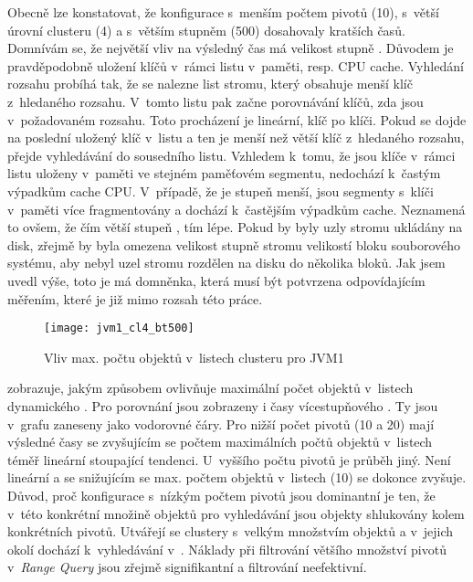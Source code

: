 Obecně lze konstatovat, že konfigurace s~menším počtem pivotů (\num{10}), s~větší úrovní clusteru (\num{4}) a s~větším stupněm \BPTree{} (\num{500}) dosahovaly kratších časů.
Domnívám se, že největší vliv na výsledný čas má velikost stupně \BPTree{}.
Důvodem je pravděpodobně uložení klíčů v~rámci listu v~paměti, resp. CPU cache.
Vyhledání rozsahu probíhá tak, že se nalezne list stromu, který obsahuje menší klíč z~hledaného rozsahu.
V~tomto listu pak začne porovnávání klíčů, zda jsou v~požadovaném rozsahu.
Toto procházení je lineární, klíč po klíči.
Pokud se dojde na poslední uložený klíč v~listu a ten je menší než větší klíč z~hledaného rozsahu, přejde vyhledávání do sousedního listu.
Vzhledem k~tomu, že jsou klíče v~rámci listu uloženy v~paměti ve stejném paměťovém segmentu, nedochází k~častým výpadkům cache CPU.
V~případě, že je stupeň \BPTree{} menší, jsou segmenty s~klíči v~paměti více fragmentovány a dochází k~častějším výpadkům cache.
Neznamená to ovšem, že čím větší stupeň \BPTree{}, tím lépe. 
Pokud by byly uzly stromu ukládány na disk, zřejmě by byla omezena velikost stupně stromu velikostí bloku souborového systému, aby nebyl uzel stromu rozdělen na disku do několika bloků.
Jak jsem uvedl výše, toto je má domněnka, která musí být potvrzena odpovídajícím měřením, které je již mimo rozsah této práce.

\begin{figure}[t]
\centering
\texttt{[image: jvm1\_cl4\_bt500]}
\caption{Vliv max. počtu objektů v~listech clusteru pro JVM1}
\label{fig:jvm1cl4_bt500}
\end{figure}

 zobrazuje, jakým způsobem ovlivňuje maximální počet objektů v~listech dynamického .
Pro porovnání jsou zobrazeny i časy vícestupňového .
Ty jsou v~grafu zaneseny jako vodorovné čáry.
Pro nižší počet pivotů (\num{10} a \num{20}) mají výsledné časy se zvyšujícím se počtem maximálních počtů objektů v~listech téměř lineární stoupající tendenci.
U~vyššího počtu pivotů je průběh jiný.
Není lineární a se snižujícím se max. počtem objektů v~listech (\num{10}) se dokonce zvyšuje.
Důvod, proč konfigurace s~nízkým počtem pivotů jsou dominantní je ten, že v~této konkrétní množině objektů pro vyhledávání jsou objekty shlukovány kolem konkrétních pivotů.
Utvářejí se clustery s~velkým množstvím objektů a v~jejich okolí dochází k~vyhledávání v~\BPTree{}.
Náklady při filtrování většího množství pivotů v~\emph{Range Query} jsou zřejmě signifikantní a filtrování neefektivní.

